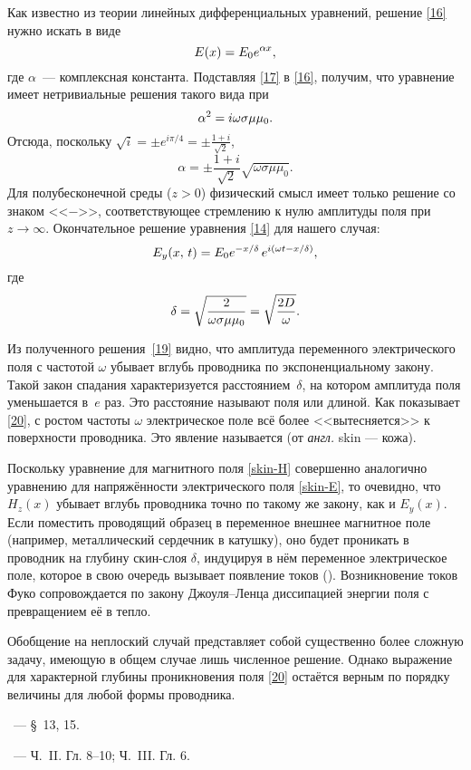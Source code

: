 Как известно из теории линейных дифференциальных уравнений, решение
\eqref{16} нужно искать в виде 
\begin{equation} \eqmark{17}
E(x)=E_0 e^{\alpha x},
\end{equation}
где $\alpha$~--- комплексная константа. 
Подставляя \eqref{17} в \eqref{16}, получим, что уравнение имеет
нетривиальные решения такого вида при
\begin{equation} \eqmark{18}
\alpha^2=i\omega\sigma\mu\mu_0.
\end{equation}
Отсюда, поскольку $\sqrt{i} = \pm e^{i\pi/4}  = \pm \frac{1+i}{\sqrt{2}}$,
\begin{equation*}
\alpha=\pm\frac{1+i}{\sqrt{2}}\sqrt{\omega\sigma\mu\mu_0}.
\end{equation*}
Для полубесконечной среды ($z>0$) физический смысл имеет только решение
со знаком <<$-$>>, соответствующее стремлению к нулю амплитуды поля 
при $z\to \infty$. 
Окончательное решение уравнения \eqref{14} для нашего случая:
\begin{equation} \eqmark{19}
E_y(x,\,t)=E_0e^{-x/\delta}\,e^{i(\omega t- x/\delta)},
\end{equation}
где
\begin{equation} \eqmark{20}
\delta = \sqrt{\frac{2}{\omega\sigma\mu\mu_0}} = \sqrt{\frac{2D}{\omega}}.
\end{equation}

Из полученного решения~\eqref{19} видно, что амплитуда переменного
электрического поля с частотой $\omega$ убывает вглубь
проводника по экспоненциальному закону. 
Такой закон спадания характеризуется расстоянием~$\delta$, 
на котором амплитуда поля уменьшается в~$e$ раз. 
Это расстояние называют  поля
или  длиной.
Как показывает \eqref{20}, 
с ростом частоты $\omega$ электрическое поле всё более <<вытесняется>> 
к поверхности проводника. Это явление называется 
(от \emph{англ.} skin --- кожа). 

Поскольку уравнение для магнитного поля \eqref{skin-H} совершенно аналогично
уравнению для напряжённости электрического поля \eqref{skin-E}, то очевидно, 
что $H_z(x)$ убывает вглубь проводника точно по такому же закону, 
как и $E_y(x)$. Если поместить проводящий образец в переменное внешнее магнитное поле
(например, металлический сердечник в катушку),
оно будет проникать в проводник на глубину скин-слоя $\delta$, индуцируя в нём
переменное электрическое поле, которое в свою очередь 
вызывает появление токов (). Возникновение токов Фуко
сопровождается по закону Джоуля--Ленца диссипацией энергии поля с превращением
её в тепло.

Обобщение на неплоский случай представляет собой
существенно более сложную задачу, имеющую в общем случае лишь численное решение.
Однако выражение для характерной глубины проникновения поля \eqref{20} 
остаётся верным по порядку величины для любой формы проводника.


\begin{lab:literature}
    \item \Kirichenko~--- \S~13, 15.
    \item \KingLokOlh~--- Ч.~II. Гл. 8--10; Ч.~III. Гл. 6.
\end{lab:literature}
    
